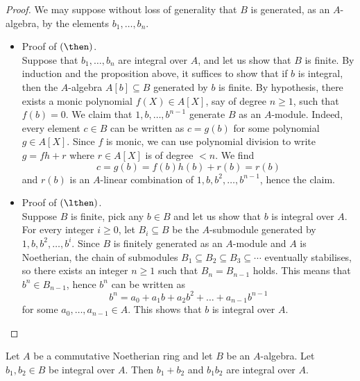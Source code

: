 \documentclass[12pt, a4paper]{article}
\begin{document}
\begin{proof}
    We may suppose without loss of generality that \( B \) is generated, as an \( A \)-algebra, by the elements \( b_1, \ldots, b_n \).
    \begin{itemize}
        \item Proof of \((\then)\). \\
        Suppose that \( b_1, \ldots, b_n \) are integral over \( A \), and let us show that \( B \) is finite. By induction and the proposition above, it suffices to show that if \( b \) is integral, then the \( A \)-algebra \( A[b] \subseteq B \) generated by \( b \) is finite. By hypothesis, there exists a monic polynomial \( f(X) \in A[X] \), say of degree \( n \geq 1 \), such that \( f(b) = 0 \). We claim that \( 1, b, \ldots, b^{n-1} \) generate \( B \) as an \( A \)-module. Indeed, every element \( c \in B \) can be written as \( c = g(b) \) for some polynomial \( g \in A[X] \). Since \( f \) is monic, we can use polynomial division to write \( g = fh + r \) where \( r \in A[X] \) is of degree \( < n \). We find
        \[
        c = g(b) = f(b)h(b) + r(b) = r(b)
        \]
        and \( r(b) \) is an \( A \)-linear combination of \( 1, b, b^2, \ldots, b^{n-1} \), hence the claim.
        \item Proof of \((\lthen)\). \\
        Suppose \( B \) is finite, pick any \( b \in B \) and let us show that \( b \) is integral over \( A \). For every integer \( i \geq 0 \), let \( B_i \subseteq B \) be the \( A \)-submodule generated by \( 1, b, b^2, \ldots, b^i \). Since \( B \) is finitely generated as an \( A \)-module and \( A \) is Noetherian, the chain of submodules \( B_1 \subseteq B_2 \subseteq B_3 \subseteq \cdots \) eventually stabilises, so there exists an integer \( n \geq 1 \) such that \( B_n = B_{n-1} \) holds. This means that \( b^n \in B_{n-1} \), hence \( b^n \) can be written as
        \[
        b^n = a_0 + a_1b + a_2b^2 + \ldots + a_{n-1}b^{n-1}
        \]
        for some \( a_0, \ldots, a_{n-1} \in A \). This shows that \( b \) is integral over \( A \).
    \end{itemize}
\end{proof}

\begin{theorem}
    Let \( A \) be a commutative Noetherian ring and let \( B \) be an \( A \)-algebra. Let \( b_1, b_2 \in B \) be integral over \( A \). Then \( b_1 + b_2 \) and \( b_1b_2 \) are integral over \( A \).
\end{theorem}
\end{document}
